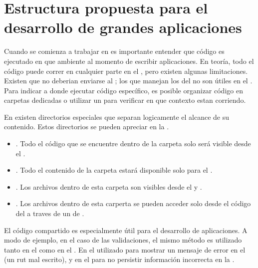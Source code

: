 \section{Estructura propuesta para el desarrollo de grandes aplicaciones}\label{cap:arquitectura:section:generic_architecture_structure}

Cuando se comienza a trabajar en \meteorNAME es importante entender que código es ejecutado en que ambiente al momento de escribir aplicaciones. En teoría, todo el código puede correr en cualquier parte en el \stackAS, pero existen algunas limitaciones. Existen \apikeyAS que no deberian enviarse al \clientAS; los \events que manejan los \clicksPC del \mousePC no son útiles en el \serverAS. Para indicar a \meteorNAME donde ejecutar código específico, es posible organizar código en carpetas dedicadas o utilizar un \checkCPT para verificar en que contexto estan corriendo.

En \meteorNAME existen directorios especiales que separan logicamente el alcance de su contenido. Estos directorios se pueden apreciar en la .


	\begin{itemize}
		\item
			\textbf{\clientFolder}. Todo el código que se encuentre dentro de la carpeta  \clientFolder solo será visible desde el \clientSideAS.
		\item
			\textbf{\serverFolder}.  Todo el contenido de la carpeta \serverFolder estará disponible solo para el \serverSideAS.
		\item
			\textbf{\publicFolder}. Los archivos dentro de esta carpeta son visibles desde el \clientSideAS y \serverSideAS.
		\item
			\textbf{\privateFolder}. Los archivos dentro de esta carperta se pueden acceder solo desde el código del \serverAS a traves de un \apiAS de \assetsAS.
	\end{itemize}



El código compartido es especialmente útil para el desarrollo de aplicaciones. A modo de ejemplo, en el caso de las validaciones, el mismo método es utilizado tanto en el \clientSideAS como en el \serverSideAS. En el \clientSideAS utilizado para mostrar un mensaje de error en el \browserINT (un rut mal escrito), y en el \serverSideAS para no persistir información incorrecta en la \dataBaseDB.

